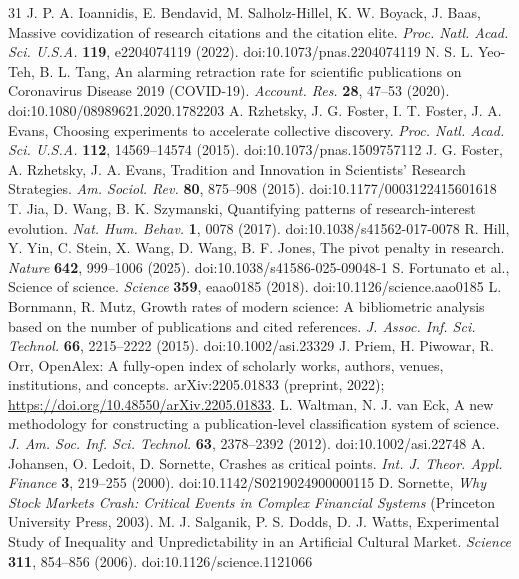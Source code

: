 \begin{thebibliography}{31}
 J. P. A. Ioannidis, E. Bendavid, M. Salholz-Hillel, K. W. Boyack, J. Baas, Massive covidization of research citations and the citation elite. \textit{Proc. Natl. Acad. Sci. U.S.A.} \textbf{119}, e2204074119 (2022). doi:10.1073/pnas.2204074119
 N. S. L. Yeo-Teh, B. L. Tang, An alarming retraction rate for scientific publications on Coronavirus Disease 2019 (COVID-19). \textit{Account. Res.} \textbf{28}, 47–53 (2020). doi:10.1080/08989621.2020.1782203
 A. Rzhetsky, J. G. Foster, I. T. Foster, J. A. Evans, Choosing experiments to accelerate collective discovery. \textit{Proc. Natl. Acad. Sci. U.S.A.} \textbf{112}, 14569–14574 (2015). doi:10.1073/pnas.1509757112
 J. G. Foster, A. Rzhetsky, J. A. Evans, Tradition and Innovation in Scientists’ Research Strategies. \textit{Am. Sociol. Rev.} \textbf{80}, 875–908 (2015). doi:10.1177/0003122415601618
 T. Jia, D. Wang, B. K. Szymanski, Quantifying patterns of research-interest evolution. \textit{Nat. Hum. Behav.} \textbf{1}, 0078 (2017). doi:10.1038/s41562-017-0078
 R. Hill, Y. Yin, C. Stein, X. Wang, D. Wang, B. F. Jones, The pivot penalty in research. \textit{Nature} \textbf{642}, 999–1006 (2025). doi:10.1038/s41586-025-09048-1
 S. Fortunato et al., Science of science. \textit{Science} \textbf{359}, eaao0185 (2018). doi:10.1126/science.aao0185
 L. Bornmann, R. Mutz, Growth rates of modern science: A bibliometric analysis based on the number of publications and cited references. \textit{J. Assoc. Inf. Sci. Technol.} \textbf{66}, 2215–2222 (2015). doi:10.1002/asi.23329
 J. Priem, H. Piwowar, R. Orr, OpenAlex: A fully-open index of scholarly works, authors, venues, institutions, and concepts. arXiv:2205.01833 (preprint, 2022); \url{https://doi.org/10.48550/arXiv.2205.01833}.
 L. Waltman, N. J. van Eck, A new methodology for constructing a publication‐level classification system of science. \textit{J. Am. Soc. Inf. Sci. Technol.} \textbf{63}, 2378–2392 (2012). doi:10.1002/asi.22748
 A. Johansen, O. Ledoit, D. Sornette, Crashes as critical points. \textit{Int. J. Theor. Appl. Finance} \textbf{3}, 219–255 (2000). doi:10.1142/S0219024900000115
 D. Sornette, \textit{Why Stock Markets Crash: Critical Events in Complex Financial Systems} (Princeton University Press, 2003).
 M. J. Salganik, P. S. Dodds, D. J. Watts, Experimental Study of Inequality and Unpredictability in an Artificial Cultural Market. \textit{Science} \textbf{311}, 854–856 (2006). doi:10.1126/science.1121066

\end{thebibliography}
